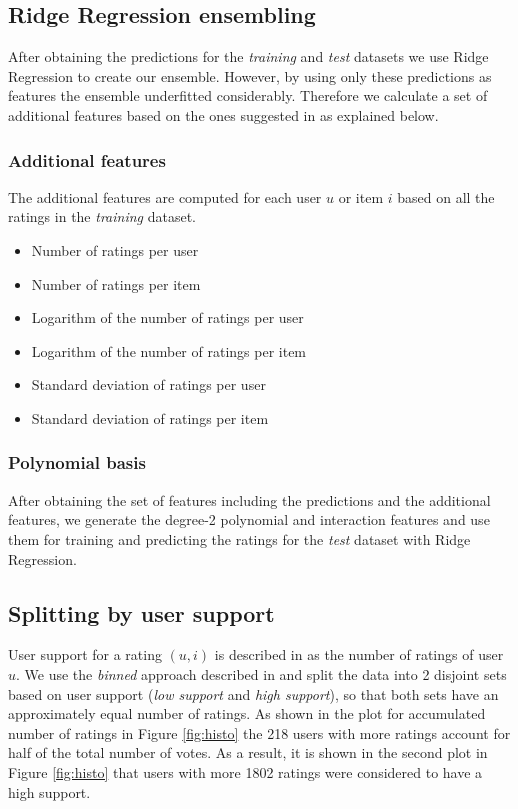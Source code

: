 \documentclass[10pt,conference,compsocconf]{IEEEtran}
\begin{document}
  \subsection{Ridge Regression ensembling} %
  \label{sub:ridge_regression_ensembling}
    After obtaining the predictions for the \emph{training} and \emph{test} datasets we use Ridge Regression to create our ensemble. However, by using only these predictions as features the ensemble underfitted considerably. Therefore we calculate a set of additional features based on the ones suggested in \cite{sill2009feature} as explained below.

    \subsubsection{Additional features} %
    \label{ssub:meta_features}
      The additional features are computed for each user $u$ or item $i$ based on all the ratings in the \emph{training} dataset.
      \begin{itemize}
        \item Number of ratings per user
        \item Number of ratings per item
        \item Logarithm of the number of ratings per user
        \item Logarithm of the number of ratings per item
        \item Standard deviation of ratings per user
        \item Standard deviation of ratings per item
      \end{itemize}
    \subsubsection{Polynomial basis} %
    \label{ssub:polynomial_basis}
      After obtaining the set of features including the predictions and the additional features, we generate the degree-2 polynomial and interaction features and use them for training and predicting the ratings for the \emph{test} dataset with Ridge Regression.

  \subsection{Splitting by user support} %
  \label{sub:user_support}
    User support for a rating $(u,i)$ is described in \cite{toscher2009bigchaos} as the number of ratings of user $u$. We use the \emph{binned} approach described in \cite{jahrer2010combining} and split the data into 2 disjoint sets based on user support (\emph{low support} and \emph{high support}), so that both sets have an approximately equal number of ratings. As shown in the plot for accumulated number of ratings in Figure \ref{fig:histo} the 218 users with more ratings account for half of the total number of votes. As a result, it is shown in the second plot in Figure \ref{fig:histo} that users with more 1802 ratings were considered to have a high support.
\end{document}
